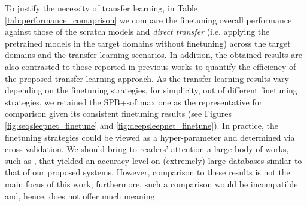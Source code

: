 \documentclass[journal,twoside,web]{ieeecolor}
\begin{document}
To justify the necessity of transfer learning, in Table \ref{tab:performance_comaprison} we compare the finetuning overall performance against those of the scratch models and \emph{direct transfer} (i.e. applying the pretrained models in the target domains without finetuning) across the target domains and the transfer learning scenarios. In addition, the obtained results are also contrasted to those reported in previous works to quantify the efficiency of the proposed transfer learning approach. As the transfer learning results vary depending on the finetuning strategies, for simplicity, out of different finetuning strategies, we retained the SPB+softmax one as the representative for comparison given its consistent finetuning results (see Figures  \ref{fig:seqsleepnet_finetune} and \ref{fig:deepsleepnet_finetune}).  In practice, the finetuning strategies could be viewed as a hyper-parameter and determined via cross-validation. We should bring to readers' attention a large body of works, such as \cite{Biswal2018a,Stephansen2018,Sun2017,Olesen2018}, that yielded an accuracy level on (extremely) large databases similar to that of our proposed systems. However, comparison to these results is not the main focus of this work; furthermore, such a comparison would be incompatible and, hence, does not offer much meaning.
\end{document}
